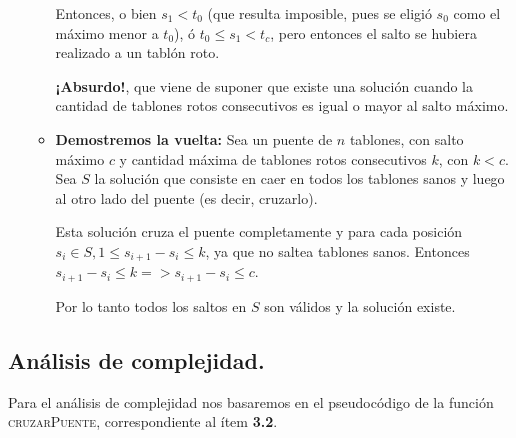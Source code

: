 \begin{itemize}
\begin{itemize}
Entonces, o bien $s_1 < t_0$ (que resulta imposible, pues se eligió $s_0$ como el máximo
menor a $t_0$), ó $t_0 \leq s_1 < t_c$, pero entonces el salto se hubiera realizado a un
tablón roto. \medskip

\textbf{¡Absurdo!}, que viene de suponer que existe una solución cuando la cantidad de
tablones rotos consecutivos es igual o mayor al salto máximo. \medskip

\item \textbf{Demostremos la vuelta:}
Sea un puente de $n$ tablones, con salto máximo $c$ y cantidad máxima de
tablones rotos consecutivos $k$, con $k < c$.
Sea $S$ la solución que consiste en caer en todos los tablones sanos y luego al
otro lado del puente (es decir, cruzarlo).

Esta solución cruza el puente completamente y para cada posición 
$s_i \in S, 1 \leq s_{i+1} - s_i \leq k$, ya que no saltea tablones sanos.
Entonces $s_{i+1} - s_i \leq k => s_{i+1} - s_i \leq c$. 

Por lo tanto todos los saltos en $S$ son válidos y la solución existe.
\end{itemize}

\end{itemize}



\subsection{Análisis de complejidad.}

\vspace*{0.3cm}

Para el análisis de complejidad nos basaremos en el pseudocódigo de la función 
\textsc{cruzarPuente}, correspondiente al ítem \textbf{3.2}.

